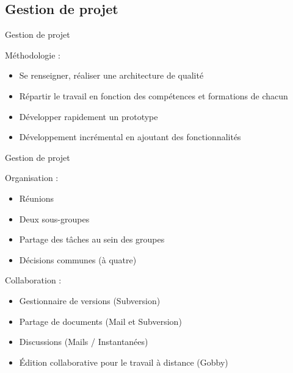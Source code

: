 \documentclass{beamer}
\begin{document}
      \subsection{Gestion de projet}
            \begin{frame}{Gestion de projet}
                  \begin{block}{Méthodologie :}
                  \begin{itemize}
                  \item Se renseigner, réaliser une architecture de qualité
                  \item Répartir le travail en fonction des compétences et formations de chacun
                  \item Développer rapidement un prototype
                  \item Développement incrémental en ajoutant des fonctionnalités
                  \end{itemize}
                  \end{block}
            \end{frame}
            
            \begin{frame}{Gestion de projet}
                  \begin{block}{Organisation :}
                  \begin{itemize}
                        \item{Réunions}
                        \item{Deux sous-groupes}
                        \item{Partage des tâches au sein des groupes}
                        \item{Décisions communes (à quatre)}
                  \end{itemize}
                  \end{block}
            
		\begin{block}{Collaboration :}
			\begin{itemize}
			\item{Gestionnaire de versions (Subversion)}
			\item{Partage de documents (Mail et Subversion)}
			\item{Discussions (Mails / Instantanées)}
			\item{Édition collaborative pour le travail à distance (Gobby)}
			\end{itemize}
		\end{block}
            \end{frame}
            
\end{document}
